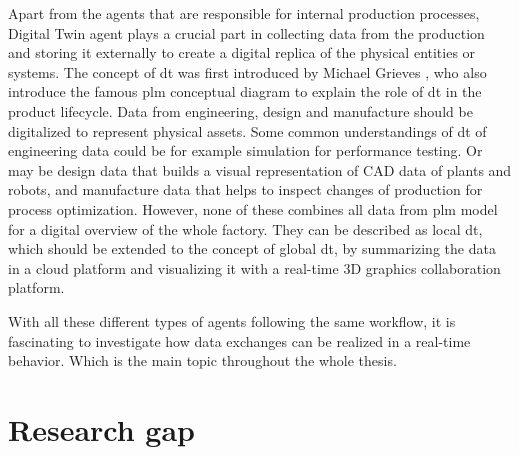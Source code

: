 Apart from the agents that are responsible for internal production processes, Digital Twin agent plays a crucial part in collecting data from the production and storing it externally to create a digital replica of the physical entities or systems. The concept of \gls{dt} was first introduced by Michael Grieves \cite{flumerfelt_complex_2019}, who also introduce the famous \gls{plm} conceptual diagram \cite{greengard_digital_nodate}to explain the role of \gls{dt} in the product lifecycle. Data from engineering, design and manufacture should be digitalized to represent physical assets. Some common understandings of \gls{dt} of engineering data could be for example simulation for performance testing. Or may be design data that builds a visual representation of CAD data of plants and robots, and manufacture data that helps to inspect changes of production for process optimization. However, none of these combines all data from \gls{plm} model for a digital overview of the whole factory. They can be described as local \gls{dt}, which should be extended to the concept of global \gls{dt}, by summarizing the data in a cloud platform and visualizing it with a real-time 3D graphics collaboration platform. 



With all these different types of agents following the same workflow, it is fascinating to investigate how data exchanges can be realized in a real-time behavior. Which is the main topic throughout the whole thesis.


\section{Research gap}